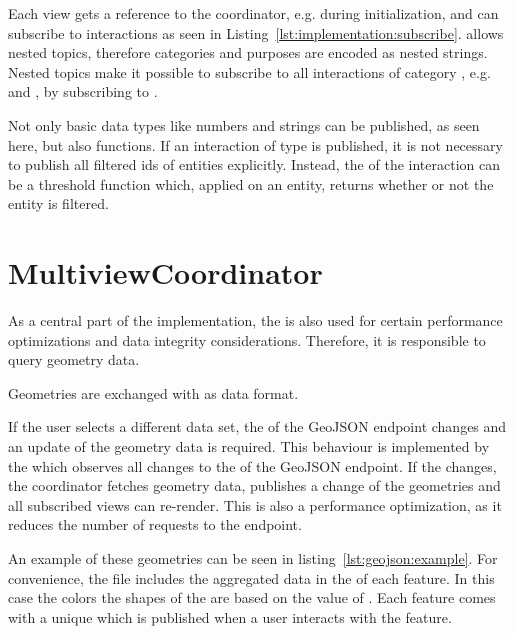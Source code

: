 Each view gets a reference to the coordinator, e.g. during initialization, and can subscribe to interactions as seen in Listing~\ref{lst:implementation:subscribe}.
 allows nested topics, therefore categories and purposes are encoded as nested strings.
Nested topics make it possible to subscribe to all interactions of category , e.g.\  and , by subscribing to .

Not only basic data types like numbers and strings can be published, as seen here, but also functions.
If an interaction of type  is published, it is not necessary to publish all filtered ids of entities explicitly.
Instead, the  of the interaction can be a threshold function which, applied on an entity, returns whether or not the entity is filtered.




\section{MultiviewCoordinator}

As a central part of the implementation, the  is also used for certain performance optimizations and data integrity considerations.
Therefore, it is responsible to query geometry data.

Geometries are exchanged with \footnotemark as data format.

If the user selects a different data set, the  of the GeoJSON endpoint changes and an update of the geometry data is required.
This behaviour is implemented by the  which observes all changes to the  of the GeoJSON endpoint.
If the  changes, the coordinator fetches geometry data, publishes a change of the geometries and all subscribed views can re-render.
This is also a performance optimization, as it reduces the number of requests to the  endpoint.

An example of these geometries can be seen in listing~\ref{lst:geojson:example}.
For convenience, the file includes the aggregated data in the  of each feature.
In this case the colors the shapes of the \tmap{} are based on the value of .
Each feature comes with a unique  which is published when a user interacts with the feature.

